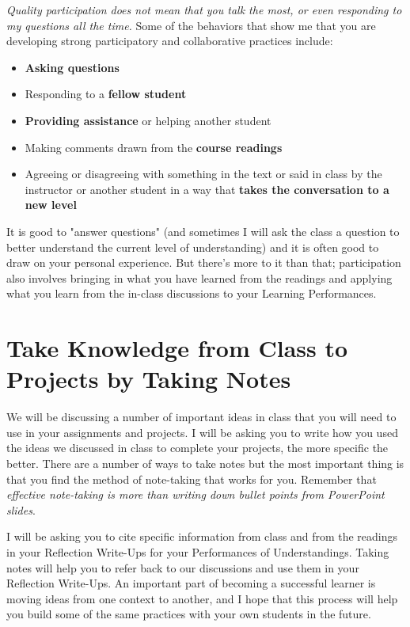 \documentclass{tufte-handout}
\begin{document}
\emph{Quality participation does not mean that you talk the most, or even responding to my questions all the time.} Some of the behaviors that show me that you are developing strong participatory and collaborative practices include:
\begin{itemize}
	\itemsep-0.5em
	\item \textbf{Asking questions}
	\item Responding to a \textbf{fellow student}
	\item \textbf{Providing assistance} or helping another student
	\item Making comments drawn from the \textbf{course readings}
	\item Agreeing or disagreeing with something in the text or said in class by the instructor or another student in a way that \textbf{takes the conversation to a new level}
\end{itemize}
It is good to "answer questions" (and sometimes I will ask the class a question to better understand the current level of understanding) and it is often good to draw on your personal experience. But there's more to it than that; participation also involves bringing in what you have learned from the readings and applying what you learn from the in-class discussions to your Learning Performances.

\section{Take Knowledge from Class to Projects by Taking Notes}
We will be discussing a number of important ideas in class that you will need to use in your assignments and projects. I will be asking you to write how you used the ideas we discussed in class to complete your projects, the more specific the better. There are a number of ways to take notes but the most important thing is that you find the method of note-taking that works for you. Remember that \emph{effective note-taking is more than writing down bullet points from PowerPoint slides}.

 I will be asking you to cite specific information from class and from the readings in your \textsf{Reflection Write-Ups} for your \textsf{Performances of Understandings}. Taking notes will help you to refer back to our discussions and use them in your \textsf{Reflection Write-Ups}. An important part of becoming a successful learner is moving ideas from one context to another, and I hope that this process will help you build some of the same practices with your own students in the future.
\end{document}
